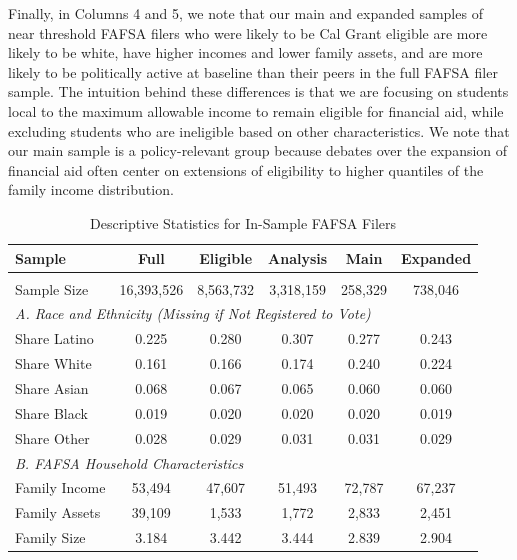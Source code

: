 \documentclass[12pt,letterpaper,oneside]{book}
\begin{document}
    Finally, in Columns 4 and 5, we note that our main and expanded samples of near threshold FAFSA filers who were likely to be Cal Grant eligible are more likely to be white, have higher incomes and lower family assets, and are more likely to be politically active at baseline than their peers in the full FAFSA filer sample. The intuition behind these differences is that we are focusing on students local to the maximum allowable income to remain eligible for financial aid, while excluding students who are ineligible based on other characteristics. We note that our main sample is a policy-relevant group because debates over the expansion of financial aid often center on extensions of eligibility to higher quantiles of the family income distribution.

    \clearpage

        \begin{table}[h!]\centering
        \def\sym#1{\ifmmode^{#1}\else\(^{#1}\)\fi}
        \caption{Descriptive Statistics for In-Sample FAFSA Filers\label{tab:descriptives}}
        \begin{tabular}{l*{1}{c c c c c}}
            \hline\hline
            Sample  &  Full  & Eligible  & Analysis & Main & Expanded \\
            \hline
            &&&&&\\
            Sample Size & 16,393,526 & 8,563,732 & 3,318,159 & 258,329 & 738,046\\ [0.5em]
            \multicolumn{6}{l}{\textit{A. Race and Ethnicity (Missing if Not Registered to Vote)}} \\ [0.5em]
            Share Latino & 0.225 & 0.280 & 0.307 & 0.277 & 0.243\\
            Share White  & 0.161  & 0.166  & 0.174  & 0.240  & 0.224 \\
            Share Asian & 0.068 & 0.067 & 0.065 & 0.060 & 0.060\\
            Share Black  & 0.019  & 0.020  & 0.020  & 0.020  & 0.019 \\
            Share Other  & 0.028  & 0.029  & 0.031  & 0.031  & 0.029 \\[0.5em]
            \multicolumn{6}{l}{\textit{B. FAFSA Household Characteristics}} \\ [0.5em]
            Family Income & 53,494 & 47,607 & 51,493 & 72,787 & 67,237\\
            Family Assets  & 39,109  & 1,533  & 1,772  & 2,833  & 2,451 \\
            Family Size & 3.184 & 3.442 & 3.444 & 2.839 & 2.904\\

\end{tabular}
\end{table}
\end{document}
